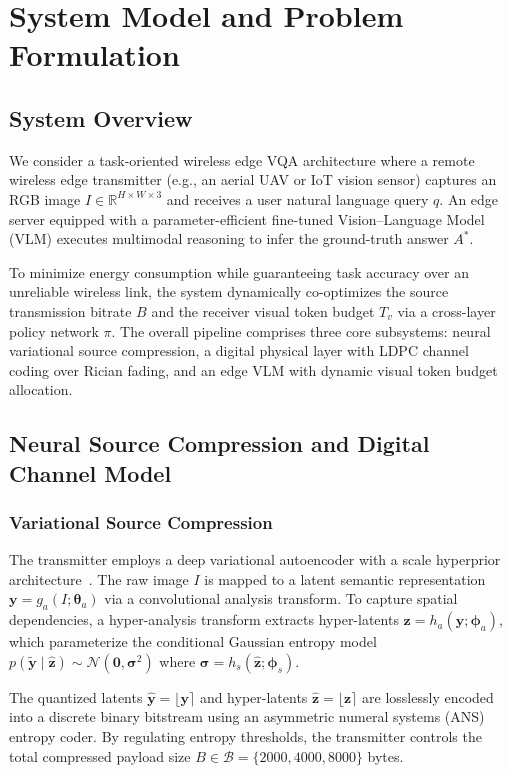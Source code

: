 \section{System Model and Problem Formulation}\label{sec:system}

\subsection{System Overview}
We consider a task-oriented wireless edge VQA architecture where a remote wireless edge transmitter (e.g., an aerial UAV or IoT vision sensor) captures an RGB image $I \in \mathbb{R}^{H \times W \times 3}$ and receives a user natural language query $q$. An edge server equipped with a parameter-efficient fine-tuned Vision--Language Model (VLM) executes multimodal reasoning to infer the ground-truth answer $A^*$. 

To minimize energy consumption while guaranteeing task accuracy over an unreliable wireless link, the system dynamically co-optimizes the source transmission bitrate $B$ and the receiver visual token budget $T_v$ via a cross-layer policy network $\pi$. The overall pipeline comprises three core subsystems: neural variational source compression, a digital physical layer with LDPC channel coding over Rician fading, and an edge VLM with dynamic visual token budget allocation.

\subsection{Neural Source Compression and Digital Channel Model}
\subsubsection{Variational Source Compression}
The transmitter employs a deep variational autoencoder with a scale hyperprior architecture~\cite{balle2018variational,begaint2020compressai}. The raw image $I$ is mapped to a latent semantic representation $\mathbf{y} = g_a(I; \boldsymbol{\theta}_a)$ via a convolutional analysis transform. To capture spatial dependencies, a hyper-analysis transform extracts hyper-latents $\mathbf{z} = h_a(\mathbf{y}; \boldsymbol{\phi}_a)$, which parameterize the conditional Gaussian entropy model $p(\mathbf{\tilde y} \mid \mathbf{\hat z}) \sim \mathcal{N}(\mathbf{0}, \boldsymbol{\sigma}^2)$ where $\boldsymbol{\sigma} = h_s(\mathbf{\hat z}; \boldsymbol{\phi}_s)$. 

The quantized latents $\mathbf{\hat y} = \lfloor \mathbf{y} \rceil$ and hyper-latents $\mathbf{\hat z} = \lfloor \mathbf{z} \rceil$ are losslessly encoded into a discrete binary bitstream using an asymmetric numeral systems (ANS) entropy coder. By regulating entropy thresholds, the transmitter controls the total compressed payload size $B \in \mathcal{B} = \{2000, 4000, 8000\}$ bytes.

